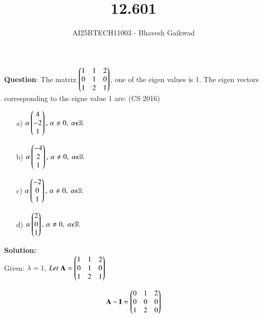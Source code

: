 \documentclass[journal]{IEEEtran}
\begin{document}

\vspace{3cm}

\title{12.601}
\author{AI25BTECH11003 - Bhavesh Gaikwad}
{\let\newpage\relax\maketitle}

\renewcommand{\thefigure}{\theenumi}
\renewcommand{\thetable}{\theenumi}
\setlength{\intextsep}{10pt} 

\renewcommand{\thetable}{\theenumi}


\textbf{Question}: 
The matrix $\begin{pmatrix}1 & 1 & 2 \\ 0 & 1 & 0 \\ 1 & 2 & 1\end{pmatrix}$, one of the eigen values is 1. The eigen vectors corresponding to the eigne value 1 are:
\hfill{(CS 2016)}\\

\begin{itemize}
    \item[a)] $\alpha\begin{pmatrix}4 \\ -2 \\ 1\end{pmatrix}, \, \alpha \neq 0, \; \alpha \epsilon \mathbb{R}$
    \item[b)] $\alpha\begin{pmatrix}-4 \\ 2 \\ 1\end{pmatrix}, \, \alpha \neq 0, \; \alpha \epsilon \mathbb{R}$
    \item[c)]$\alpha\begin{pmatrix}-2 \\ 0 \\ 1\end{pmatrix}, \, \alpha \neq 0, \; \alpha \epsilon \mathbb{R}$
    \item[d)]$\alpha\begin{pmatrix}2 \\ 0 \\ 1\end{pmatrix}, \, \alpha \neq 0, \; \alpha \epsilon \mathbb{R}$
\end{itemize}

\bigskip
 
\textbf{Solution:}\\
Given: $\lambda = 1$, $Let \; \mathbf{A} = \begin{pmatrix}1 & 1 & 2 \\ 0 & 1 & 0 \\ 1 & 2 & 1\end{pmatrix}$

\begin{equation}
    \mathbf{A} - \mathbf{I} = \begin{pmatrix}0 & 1 & 2 \\ 0 & 0 & 0 \\ 1 & 2 & 0\end{pmatrix}
\end{equation}
\end{document}
